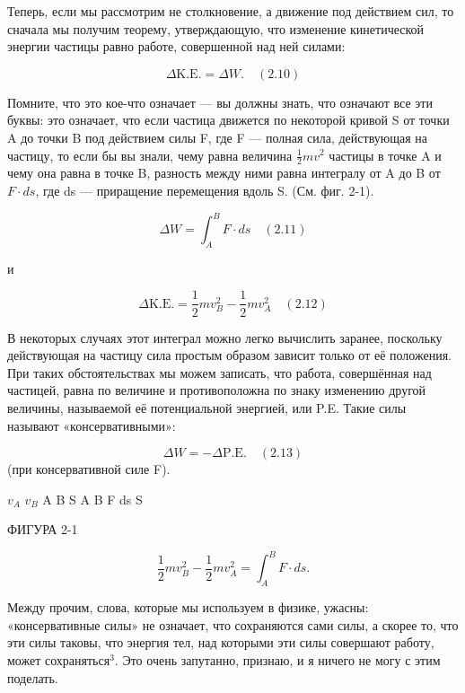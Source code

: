 \documentclass[10pt,oneside]{article}
\newcommand{\TipsRunning}[1]{\par\vspace{2bp}{\centering\footnotesize #1\par}\vspace{2bp}}
\newcommand{\TipsSubsection}[1]{\par\vspace{6bp}{\normalsize\bfseries #1\par}\vspace{2bp}}
\begin{document}
\TipsSubsection{2-3 Движение под действием сил}

Теперь, если мы рассмотрим не столкновение, а движение под действием сил, то сначала мы получим теорему, утверждающую, что изменение кинетической энергии частицы равно работе, совершенной над ней силами:\par

\[\Delta \text{K.E.} = \Delta W. \quad(2.10)\]

Помните, что это кое-что означает --- вы должны знать, что означают все эти буквы: это означает, что если частица движется по некоторой кривой S от точки A до точки B под действием силы F, где F --- полная сила, действующая на частицу, то если бы вы знали, чему равна величина \(\frac{1}{2}mv^2\) частицы в точке A и чему она равна в точке B, разность между ними равна интегралу от A до B от \(F \cdot ds\), где ds --- приращение перемещения вдоль S. (См. фиг. 2-1).\par

\[\Delta W = \int_A^B F \cdot ds \quad(2.11)\]

и\par

\[\Delta \text{K.E.} = \frac{1}{2}mv_B^2 - \frac{1}{2}mv_A^2 \quad(2.12)\]

В некоторых случаях этот интеграл можно легко вычислить заранее, поскольку действующая на частицу сила простым образом зависит только от её положения. При таких обстоятельствах мы можем записать, что работа, совершённая над частицей, равна по величине и противоположна по знаку изменению другой величины, называемой её потенциальной энергией, или P.E. Такие силы называют «консервативными»:\par

\[\Delta W = -\Delta \text{P.E.} \quad(2.13)\] (при консервативной силе F).\par

\TipsRunning{З А К О Н Ы  И  И Н Т У И Ц И Я • 6 5}

\(v_A\) \(v_B\) A B S A B F ds S\par

ФИГУРА 2-1\par

\[\frac{1}{2}mv_B^2 - \frac{1}{2}mv_A^2 = \int_A^B F \cdot ds.\]

Между прочим, слова, которые мы используем в физике, ужасны: «консервативные силы» не означает, что сохраняются сами силы, а скорее то, что эти силы таковы, что энергия тел, над которыми эти силы совершают работу, может сохраняться\(^3\). Это очень запутанно, признаю, и я ничего не могу с этим поделать.\par
\end{document}
